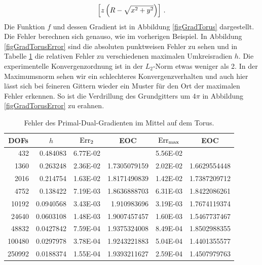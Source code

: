\begin{beispiel}[Torus]
\begin{align}
\begin{bmatrix}
                        z\left(R - \sqrt{x^{2}+y^{2}}\right)
                      \end{bmatrix} \,\text{.}
      \end{align}
      Die Funktion \( f \) und dessen Gradient ist in Abbildung \ref{figGradTorus} dargestellt.
      Die Fehler berechnen sich genauso, wie im vorherigen Beispiel.
      In Abbildung \ref{figGradTorusError} sind die absoluten punktweisen Fehler zu sehen 
      und in Tabelle \ref{tabGradTorus} die relativen Fehler zu verschiedenen maximalen Umkreisradien \( h \).
      Die experimentelle Konvergenzordnung ist in der \( L_{2} \)-Norm etwas weniger als 2.
      In der Maximumsnorm sehen wir ein schlechteres Konvergenzverhalten und auch hier lässt sich bei feineren Gittern wieder ein
      Muster für den Ort der maximalen Fehler erkennen.
      So ist die Verdrillung des Grundgitters um \( 4\pi \) in Abbildung \ref{figGradTorusError} zu erahnen.

      \begin{table}[htbp]
       \centering
       \begin{tabular}{|r|r|r|r|r|r|}
       \hline
       \multicolumn{1}{|c|}{DOFs} & \multicolumn{1}{c|}{\( h \)} & \multicolumn{1}{c|}{\( \text{Err}_{2} \)} & \multicolumn{1}{c|}{EOC} &
       \multicolumn{1}{c|}{ \( \text{Err}_{\max} \)} & \multicolumn{1}{c|}{EOC} \\ \hline
        432 & 0.484083 & 6.77E-02 & \multicolumn{1}{l|}{} & 5.56E-02 & \multicolumn{1}{l|}{} \\ \hline
        1360 & 0.263248 & 2.36E-02 & 1.7305079159 & 2.02E-02 & 1.6629554448 \\ \hline
        2016 & 0.214754 & 1.63E-02 & 1.8171490839 & 1.42E-02 & 1.7387209712 \\ \hline
        4752 & 0.138422 & 7.19E-03 & 1.8636888703 & 6.31E-03 & 1.8422086261 \\ \hline
        10192 & 0.0940568 & 3.43E-03 & 1.910983696 & 3.19E-03 & 1.7674119374 \\ \hline
        24640 & 0.0603108 & 1.48E-03 & 1.9007457457 & 1.60E-03 & 1.5467737467 \\ \hline
        48832 & 0.0427842 & 7.59E-04 & 1.9375324008 & 8.49E-04 & 1.8502988355 \\ \hline
        100480 & 0.0297978 & 3.78E-04 & 1.9243221883 & 5.04E-04 & 1.4401355577 \\ \hline
        250992 & 0.0188374 & 1.55E-04 & 1.9393211627 & 2.59E-04 & 1.4507979763 \\ \hline
       \end{tabular}
       \caption[Gradient auf Torus]{Fehler des Primal-Dual-Gradienten im Mittel auf dem Torus.}
       \label{tabGradTorus}
      \end{table}
    \end{beispiel}
